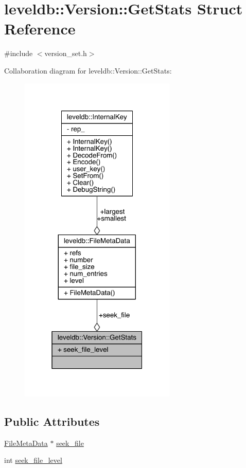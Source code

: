 \hypertarget{structleveldb_1_1_version_1_1_get_stats}{}\section{leveldb\+:\+:Version\+:\+:Get\+Stats Struct Reference}
\label{structleveldb_1_1_version_1_1_get_stats}


{\ttfamily \#include $<$version\+\_\+set.\+h$>$}



Collaboration diagram for leveldb\+:\+:Version\+:\+:Get\+Stats\+:\nopagebreak
\begin{figure}[H]
\begin{center}
\leavevmode
\includegraphics[width=211pt]{structleveldb_1_1_version_1_1_get_stats__coll__graph}
\end{center}
\end{figure}
\subsection*{Public Attributes}
\begin{DoxyCompactItemize}
\item 
\hyperlink{structleveldb_1_1_file_meta_data}{File\+Meta\+Data} $\ast$ \hyperlink{structleveldb_1_1_version_1_1_get_stats_a8c677e9a2d5bc48a5bcc40e07dd2cca7}{seek\+\_\+file}
\item 
int \hyperlink{structleveldb_1_1_version_1_1_get_stats_a6cd952d5850faf00c7d45f79973a76d4}{seek\+\_\+file\+\_\+level}
\end{DoxyCompactItemize}


